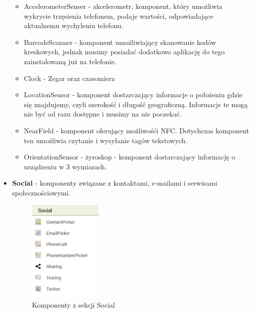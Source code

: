 \begin{itemize}
\begin{itemize}
\item AccelerometerSenser - akcelerometr, komponent, który umożliwia wykrycie trzęsienia telefonem, podaje wartości, odpowiadające aktualnemu wychyleniu telefonu.
\item BarcodeScanner - komponent umożliwiający skanowanie kodów kreskowych, jednak musimy posiadać dodatkowo aplikację do tego zainstalowaną już na telefonie.
\item Clock - Zegar oraz czasomierz
\item LocationSensor - komponent dostarczający informacje o położeniu gdzie się znajdujemy, czyli szerokość i długość geograficzną. Informacje te mogą nie być od razu dostępne i musimy na nie poczekać.
\item NearField - komponent oferujący możliwośći NFC. Dotychczas komponent ten umożliwia czytanie i wysyłanie tagów tekstowych.
\item OrientationSensor - żyroskop - komponent dostarczający informację o urządzeniu w 3 wymiarach.
\end{itemize}

\item \textbf{Social} - komponenty związane z kontaktami, e-mailami i serwisami społecznościowymi.

\begin{figure}[H] 
\centering\includegraphics[height=5cm]{figures/components/social}
\caption{Komponenty z sekcji Social}
\end{figure}


\end{itemize}
